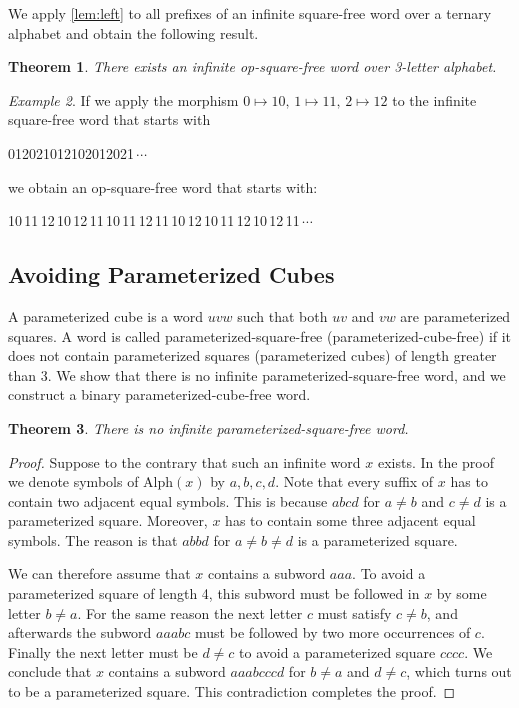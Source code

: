 \documentclass{article}
\theoremstyle{plain}
\newtheorem{theorem}{Theorem}[section]
\theoremstyle{definition}
\theoremstyle{remark}
\newtheorem{example}[theorem]{Example}
\renewcommand{\Alph}{\mathrm{Alph}}
\begin{document}
  \noindent
  We apply \cref{lem:left} to all prefixes of an infinite square-free word \cite{Thue} over a ternary alphabet
  and obtain the following result.

  \begin{theorem}
    There exists an infinite op-square-free word over 3-letter alphabet.
  \end{theorem}

  \begin{example}
    If we apply the morphism $0\mapsto 10,\, 1\mapsto 11,\, 2\mapsto 12$ to the infinite square-free word that starts with
    \begin{center}
      012021012102012021\,$\cdots$
    \end{center}
    we obtain an op-square-free word that starts with:
    \begin{center}
      10\,11\,12\,10\,12\,11\,10\,11\,12\,11\,10\,12\,10\,11\,12\,10\,12\,11\,$\cdots$
    \end{center}
  \end{example}
  
  
\subsection{Avoiding Parameterized Cubes}
  A parameterized cube is a word $uvw$ such that both $uv$ and $vw$ are parameterized squares.
  A word is called parameterized-square-free (parameterized-cube-free)
  if it does not contain parameterized squares (parameterized cubes) of length
  greater than 3.
  We show that there is no infinite parameterized-square-free word,
  and we construct a binary parameterized-cube-free word.

  \begin{theorem}
    There is no infinite parameterized-square-free word.
  \end{theorem}
  \begin{proof}
    Suppose to the contrary that such an infinite word $x$ exists.
    In the proof we denote symbols of $\Alph(x)$ by $a,b,c,d$.
    Note that every suffix of $x$ has to contain two adjacent equal symbols.
    This is because $abcd$ for $a \ne b$ and $c \ne d$ is a parameterized square.
    Moreover, $x$ has to contain some three adjacent equal symbols.
    The reason is that $abbd$ for $a \ne b \ne d$ is a parameterized square.

    We can therefore assume that $x$ contains a subword $aaa$.
    To avoid a parameterized square of length 4, this subword must be followed in $x$
    by some letter $b \ne a$.
    For the same reason the next letter $c$ must satisfy $c \ne b$, and afterwards
    the subword $aaabc$ must be followed by two more occurrences of $c$.
    Finally the next letter must be $d \ne c$ to avoid a parameterized square $cccc$.
    We conclude that $x$ contains a subword $aaabcccd$ for $b \ne a$ and $d \ne c$,
    which turns out to be a parameterized square.
    This contradiction completes the proof.
  \end{proof}
\end{document}
